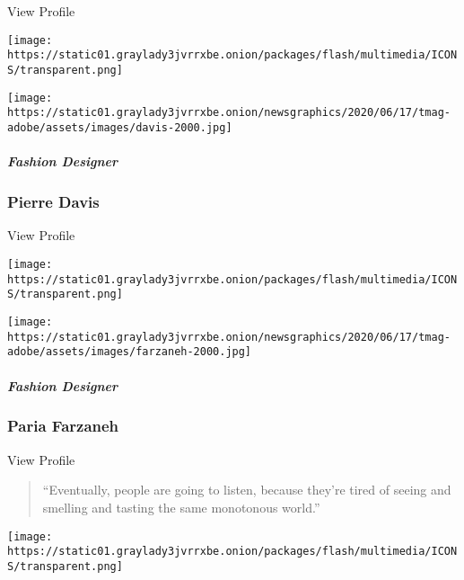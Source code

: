 View Profile

\href{https://www.nytimes3xbfgragh.onion/2020/08/10/t-magazine/pierre-davis-no-sesso.html}{}

\texttt{[image: https://static01.graylady3jvrrxbe.onion/packages/flash/multimedia/ICONS/transparent.png]}

\texttt{[image: https://static01.graylady3jvrrxbe.onion/newsgraphics/2020/06/17/tmag-adobe/assets/images/davis-2000.jpg]}

\href{https://www.nytimes3xbfgragh.onion/2020/08/10/t-magazine/pierre-davis-no-sesso.html}{}

\hypertarget{fashion-designer-1}{%
\subparagraph{Fashion Designer}\label{fashion-designer-1}}

\hypertarget{pierre-davis}{%
\subsubsection{Pierre Davis}\label{pierre-davis}}

View Profile

\href{https://www.nytimes3xbfgragh.onion/2020/08/10/t-magazine/paria-farzaneh-fashion-menswear.html}{}

\texttt{[image: https://static01.graylady3jvrrxbe.onion/packages/flash/multimedia/ICONS/transparent.png]}

\texttt{[image: https://static01.graylady3jvrrxbe.onion/newsgraphics/2020/06/17/tmag-adobe/assets/images/farzaneh-2000.jpg]}

\href{https://www.nytimes3xbfgragh.onion/2020/08/10/t-magazine/paria-farzaneh-fashion-menswear.html}{}

\hypertarget{fashion-designer-2}{%
\subparagraph{Fashion Designer}\label{fashion-designer-2}}

\hypertarget{paria-farzaneh}{%
\subsubsection{Paria Farzaneh}\label{paria-farzaneh}}

View Profile

\begin{quote}
``Eventually, people are going to listen, because they're tired of
seeing and smelling and tasting the same monotonous world.''
\end{quote}

\href{https://www.nytimes3xbfgragh.onion/2020/08/10/t-magazine/elizabeth-garouste-interior-design.html}{}

\texttt{[image: https://static01.graylady3jvrrxbe.onion/packages/flash/multimedia/ICONS/transparent.png]}

